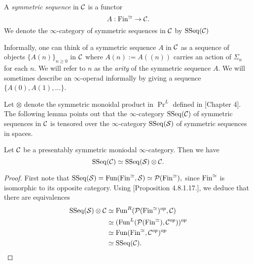 \begin{definition}
	A \emph{symmetric sequence} in ${\mathcal{C}}$ is a functor 
	$$
	A:\operatorname{Fin}^{\simeq} \to {\mathcal{C}}.
	$$ We denote the $\infty$-category of symmetric sequences in ${\mathcal{C}}$ by $\operatorname{SSeq}({\mathcal{C}})$
\end{definition}
\begin{remark}
	Informally, one can think of a symmetric sequence $A$ in ${\mathcal{C}}$ as a sequence of objects $\{A(n)\}_{n\geq 0}$ in ${\mathcal{C}}$ where $A(n):= A((n))$ carries an action of $\Sigma_n$ for each $n$.
	We will refer to $n$ as the \emph{arity} of the symmetric sequence $A$. We will sometimes describe an $\infty$-operad informally by giving a sequence $\{A(0), A(1), \dots \}$.
	
\end{remark}
Let $\otimes$ denote the symmetric monoidal product in $\Pr^L$ defined in \cite{HA}[Chapter 4]. The following lemma points out that the $\infty$-category $\operatorname{SSeq}({\mathcal{C}})$ of symmetric sequences in ${\mathcal{C}}$ is tensored over the $\infty$-category $\operatorname{SSeq}(\operatorname{\mathcal{S}})$ of symmetric sequences in spaces.
\begin{lemma}
	 Let ${\mathcal{C}}$ be a presentably symmetric moniodal $\infty$-category.
	Then we have 
	$$
	\operatorname{SSeq}({\mathcal{C}}) \simeq \operatorname{SSeq}(\operatorname{\mathcal{S}})\otimes {\mathcal{C}}.
	$$
\end{lemma}
\begin{proof}
First note that 
$
\operatorname{SSeq}(\operatorname{\mathcal{S}})=\operatorname{Fun}(\operatorname{Fin}^{\simeq}, \operatorname{\mathcal{S}})\simeq {\mathcal{P}}(\operatorname{Fin}^{\simeq}),
$
since $\operatorname{Fin}^{\simeq}$ is isomorphic to its opposite category.
Using \cite{HA}[Proposition 4.8.1.17.], we deduce that there are equivalences
\begin{align*}
	\operatorname{SSeq}(\operatorname{\mathcal{S}})\otimes {\mathcal{C}} 
& \simeq 
\operatorname{Fun}^R({\mathcal{P}}(\operatorname{Fin}^{\simeq})^{op},{\mathcal{C}})\\
&\simeq
(\operatorname{Fun}^{L}({\mathcal{P}}(\operatorname{Fin}^{\simeq}), {\mathcal{C}}^{op}))^{op}\\
& \simeq
\operatorname{Fun}(\operatorname{Fin}^{\simeq},{\mathcal{C}}^{op}) ^{op}\\
& \simeq \operatorname{SSeq}({\mathcal{C}}).
\end{align*}



\end{proof}

%

